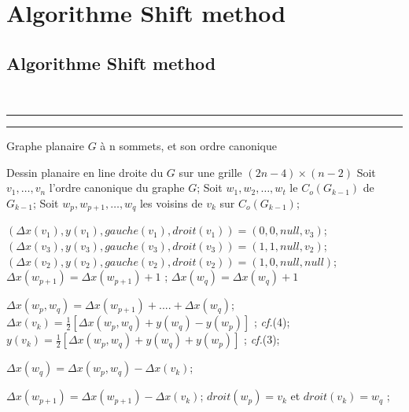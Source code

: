\documentclass[10pt]{beamer}
\newcommand{\algorithmicinput}{\textbf{Entrée:}}
\newcommand{\INPUT}{\item[\algorithmicinput]}
\newcommand{\algorithmicoutput}{\textbf{Sortie:}}
\newcommand{\OUTPUT}{\item[\algorithmicoutput]}
\begin{document}
\section{Algorithme Shift method}	
\subsection{Algorithme Shift method}	
{
\begin{frame}[allowframebreaks]{}
\fontsize{9pt}{10pt}\selectfont
\\[-.3cm]
\rule{\textwidth}{0.5pt}
\vspace*{-0.4cm}
%
\vspace*{-0.4cm}
\rule{\textwidth}{0.5pt}%
\vspace*{0.1cm}

\begin{algorithmic}[1]
\INPUT{Graphe planaire $G$ à n sommets, et son ordre canonique}
\OUTPUT{Dessin planaire en line droite du $G$ sur une grille $(2n−4) \times (n−2)$}
\Statex Soit $v_1, \dots, v_n$ l'ordre canonique du graphe $G$;	
\Statex Soit $w_1, w_2,\dots, w_t$ le $C_o(G_{k-1})$ de $G_{k-1}$;
\Statex Soit \(w_p, w_{p+1},\dots, w_q\) les voisins de $v_k$ sur $C_o(G_{k-1})$;

\State $ (\Delta x(v_1), y(v_1), gauche(v_1), droit(v_1)) = (0, 0, null, v_3) $; 
\State $ (\Delta x(v_3), y(v_3), gauche(v_3), droit(v_3)) = (1, 1, null, v_2) $;
\State $ (\Delta x(v_2), y(v_2), gauche(v_2), droit(v_2)) = (1, 0, null, null) $;
\State $ \Delta x(w_{p+1}) = \Delta x(w_{p+1})+1 $ ; 
\State $ \Delta x(w_{q}) = \Delta x(w_{q})+1 $ 

\State $ \Delta x(w_p,w_q) = \Delta x(w_{p+1}) +....+ \Delta x(w_q) $; 
\State $ \Delta x(v_k) = \frac{1}{2}[\Delta x(w_p,w_q) + y(w_q) - y(w_p)] $ ; \textit{cf.}(4);
\State $ y(v_k) = \frac{1}{2}[\Delta x(w_p,w_q) + y(w_q) + y(w_p)] $ ;  \textit{cf.}(3);

\State $ \Delta x(w_q) = \Delta x(w_p,w_q) - \Delta x(v_k) $; 

    \State $ \Delta x(w_{p+1}) = \Delta x(w_{p+1}) - \Delta x(v_k) $;
    \EndIf
\State $ droit(w_p) = v_k $ et $ droit(v_k) = w_q $ ; 


\end{algorithmic}
\end{frame}}
\end{document}
